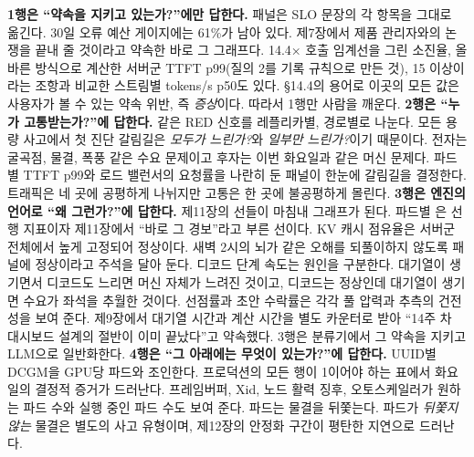 \textbf{1행은 “약속을 지키고 있는가?”에만 답한다.} 패널은 SLO 문장의 각 항목을 그대로 옮긴다. 30일 오류 예산 게이지에는 61\%가 남아 있다. 제7장에서 제품 관리자와의 논쟁을 끝내 줄 것이라고 약속한 바로 그 그래프다. 14.4× 호출 임계선을 그린 소진율, 올바른 방식으로 계산한 서버군 TTFT p99(질의 2를 기록 규칙으로 만든 것), 15 이상이라는 조항과 비교한 스트림별 tokens/s p50도 있다. §14.4의 용어로 이곳의 모든 값은 사용자가 볼 수 있는 약속 위반, 즉 \textit{증상}이다. 따라서 1행만 사람을 깨운다. \textbf{2행은 “누가 고통받는가?”에 답한다.} 같은 RED 신호를 레플리카별, 경로별로 나눈다. 모든 용량 사고에서 첫 진단 갈림길은 \textit{모두가 느린가?}와 \textit{일부만 느린가?}이기 때문이다. 전자는 굴곡점, 물결, 폭풍 같은 수요 문제이고 후자는 이번 화요일과 같은 머신 문제다. 파드별 TTFT p99와 로드 밸런서의 요청률을 나란히 둔 패널이 한눈에 갈림길을 결정한다. 트래픽은 네 곳에 공평하게 나뉘지만 고통은 한 곳에 불공평하게 몰린다. \textbf{3행은 엔진의 언어로 “왜 그런가?”에 답한다.} 제11장의 선들이 마침내 그래프가 된다. 파드별 은 선행 지표이자 제11장에서 “바로 그 경보”라고 부른 선이다. KV 캐시 점유율은 서버군 전체에서 높게 고정되어 정상이다. 새벽 2시의 뇌가 같은 오해를 되풀이하지 않도록 패널에 정상이라고 주석을 달아 둔다. 디코드 단계 속도는 원인을 구분한다. 대기열이 생기면서 디코드도 느리면 머신 자체가 느려진 것이고, 디코드는 정상인데 대기열이 생기면 수요가 좌석을 추월한 것이다. 선점률과 초안 수락률은 각각 풀 압력과 추측의 건전성을 보여 준다. 제9장에서 대기열 시간과 계산 시간을 별도 카운터로 받아 “14주 차 대시보드 설계의 절반이 이미 끝났다”고 약속했다. 3행은 분류기에서 그 약속을 지키고 LLM으로 일반화한다. \textbf{4행은 “그 아래에는 무엇이 있는가?”에 답한다.} UUID별 DCGM을 GPU당 파드와 조인한다. 프로덕션의 모든 행이 1이어야 하는 표에서 화요일의 결정적 증거가 드러난다. 프레임버퍼, Xid, 노드 활력 징후, 오토스케일러가 원하는 파드 수와 실행 중인 파드 수도 보여 준다. 파드는 물결을 뒤쫓는다. 파드가 \textit{뒤쫓지 않는} 물결은 별도의 사고 유형이며, 제12장의 안정화 구간이 평탄한 지연으로 드러난다.

